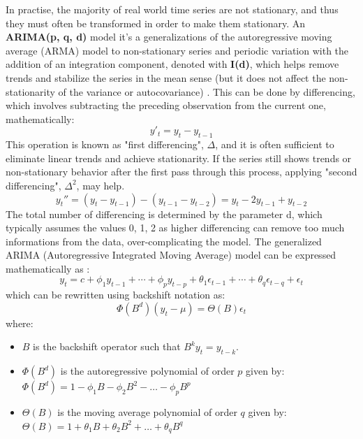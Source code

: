 In practise, the majority of real world time series are not stationary, and thus they must often be transformed in order to make them stationary. An \textbf{ARIMA(p, q, d)} model it's a generalizations of the autoregressive moving average (ARMA) model to non-stationary series and periodic variation with the addition of an integration component, denoted with \textbf{I(d)}, which helps  remove trends and stabilize the series in the mean sense (but it does not affect the non-stationarity of the variance or autocovariance) \cite{chatfield2009}. This can be done by differencing, which involves subtracting the preceding observation from the current one, mathematically:
\begin{equation}
 y'_t = y_t - y_{t-1}
\end{equation}
This operation is known as "first differencing",  \(\Delta\), and it is often sufficient to eliminate linear trends and achieve stationarity. If the series still shows trends or non-stationary behavior after the first pass through this process, applying "second differencing", \(\Delta^2\), may help. 
\begin{equation}
 y_t'' = (y_t - y_{t-1}) - (y_{t-1} - y_{t-2}) = y_t - 2y_{t-1} + y_{t-2}
\end{equation}
The total number of differencing is determined by the parameter d, which typically assumes the values 0, 1, 2 as higher differencing can remove too much informations from the data, over-complicating the model. The generalized  ARIMA (Autoregressive Integrated Moving Average) model can be expressed mathematically as \cite{Hung2023}: 
\begin{equation}
y_t = c + \phi_1 y_{t-1} + \cdots + \phi_p y_{t-p} + \theta_1 \epsilon_{t-1} + \cdots + \theta_q \epsilon_{t-q} + \epsilon_t
\end{equation}
which can be rewritten using backshift notation as:
\begin{equation}
\Phi(B^d)(y_t - \mu) = \Theta(B)\epsilon_t
\end{equation}
where: 
\begin{itemize}

    \item \( B \) is the backshift operator such that \( B^k y_t = y_{t-k} \).
    \item \( \Phi(B^d) \) is the autoregressive polynomial of order \( p \) given by: \(\Phi(B^d) = 1 - \phi_1 B - \phi_2 B^2 - \ldots - \phi_p B^p\)
    \item \( \Theta(B) \) is the moving average polynomial of order \( q \) given by: \(\Theta(B) = 1 + \theta_1 B + \theta_2 B^2 + \ldots + \theta_q B^q\)
\end{itemize}

